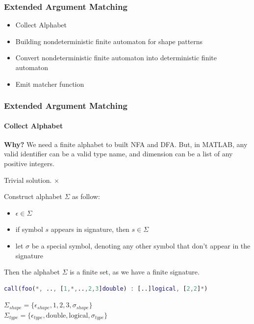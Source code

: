 \documentclass[10pt]{beamer}
\begin{document}
\begin{frame}
\frametitle{Extended Argument Matching}
\begin{itemize}
    \item Collect Alphabet
    \item Building nondeterministic finite automaton for shape patterns
    \item Convert nondeterministic finite automaton into deterministic
          finite automaton
    \item Emit matcher function
\end{itemize}
\end{frame}

\begin{frame}[fragile]
\frametitle{Extended Argument Matching}
\framesubtitle{Collect Alphabet}
\textbf{Why?} We need a finite alphabet to built NFA and DFA. But, in MATLAB,
any valid identifier can be a valid type name, and dimension can be a list of
any positive integers.

Trivial solution. $\times$

\pause

Construct alphabet $\Sigma$ as follow:
\begin{itemize}
    \item $\epsilon \in \Sigma$
    \item if symbol $s$ appears in signature, then $s \in \Sigma$
    \item let $\sigma$ be a special symbol, denoting any other symbol that
          don't appear in the signature
\end{itemize}
Then the alphabet $\Sigma$ is a finite set, as we have a finite signature.

\pause
\begin{lstlisting}[basicstyle=\small, language=MATLAB]
call(foo(*, .., [1,*,..,2,3]double) : [..]logical, [2,2]*)
\end{lstlisting}
$\Sigma_{shape} = \lbrace \epsilon_{shape}, 1, 2, 3, \sigma_{shape} \rbrace$ \\
$\Sigma_{type} = \lbrace \epsilon_{type}, \text{double},
                         \text{logical}, \sigma_{type} \rbrace$              
\end{frame}
\end{document}
